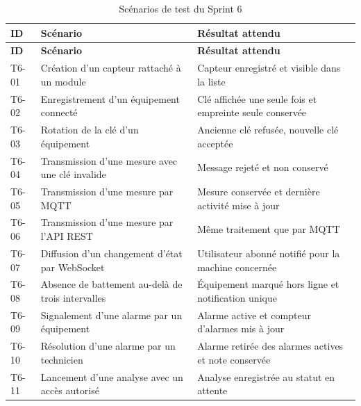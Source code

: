 {\footnotesize
\setlength{\tabcolsep}{4pt}
\begin{longtable}{|p{0.9cm}|>{\raggedright\arraybackslash}p{7cm}|>{\raggedright\arraybackslash}p{4.7cm}|}
\caption{Scénarios de test du Sprint 6}
\label{tab:tests-sprint6}\\
\hline
\textbf{ID} & \textbf{Scénario} & \textbf{Résultat attendu} \\
\hline
\endfirsthead

\hline
\textbf{ID} & \textbf{Scénario} & \textbf{Résultat attendu} \\
\hline
\endhead

T6-01 &
Création d'un capteur rattaché à un module &
Capteur enregistré et visible dans la liste \\
\hline

T6-02 &
Enregistrement d'un équipement connecté &
Clé affichée une seule fois et empreinte seule conservée \\
\hline

T6-03 &
Rotation de la clé d'un équipement &
Ancienne clé refusée, nouvelle clé acceptée \\
\hline

T6-04 &
Transmission d'une mesure avec une clé invalide &
Message rejeté et non conservé \\
\hline

T6-05 &
Transmission d'une mesure par MQTT &
Mesure conservée et dernière activité mise à jour \\
\hline

T6-06 &
Transmission d'une mesure par l'API REST &
Même traitement que par MQTT \\
\hline

T6-07 &
Diffusion d'un changement d'état par WebSocket &
Utilisateur abonné notifié pour la machine concernée \\
\hline

T6-08 &
Absence de battement au-delà de trois intervalles &
Équipement marqué hors ligne et notification unique \\
\hline

T6-09 &
Signalement d'une alarme par un équipement &
Alarme active et compteur d'alarmes mis à jour \\
\hline

T6-10 &
Résolution d'une alarme par un technicien &
Alarme retirée des alarmes actives et note conservée \\
\hline

T6-11 &
Lancement d'une analyse avec un accès autorisé &
Analyse enregistrée au statut en attente \\
\hline


\end{longtable}}
